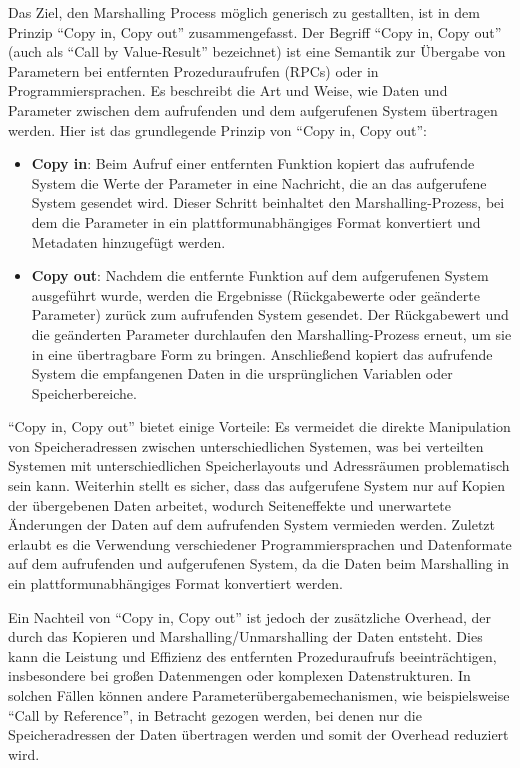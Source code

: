\documentclass[../vs-script-first-v01.tex]{subfiles}
\begin{document}
Das Ziel, den Marshalling Process möglich generisch zu gestallten, ist in dem Prinzip \enquote{Copy in, Copy out} zusammengefasst. Der Begriff \enquote{Copy in, Copy out} (auch als \enquote{Call by Value-Result} bezeichnet) ist eine Semantik zur Übergabe von Parametern bei entfernten Prozeduraufrufen (RPCs) oder in Programmiersprachen. Es beschreibt die Art und Weise, wie Daten und Parameter zwischen dem aufrufenden und dem aufgerufenen System übertragen werden. Hier ist das grundlegende Prinzip von \enquote{Copy in, Copy out}:
\begin{itemize} 
\item \textbf{Copy in}: Beim Aufruf einer entfernten Funktion kopiert das aufrufende System die Werte der Parameter in eine Nachricht, die an das aufgerufene System gesendet wird. Dieser Schritt beinhaltet den Marshalling-Prozess, bei dem die Parameter in ein plattformunabhängiges Format konvertiert und Metadaten hinzugefügt werden.
\item \textbf{Copy out}: Nachdem die entfernte Funktion auf dem aufgerufenen System ausgeführt wurde, werden die Ergebnisse (Rückgabewerte oder geänderte Parameter) zurück zum aufrufenden System gesendet. Der Rückgabewert und die geänderten Parameter durchlaufen den Marshalling-Prozess erneut, um sie in eine übertragbare Form zu bringen. Anschließend kopiert das aufrufende System die empfangenen Daten in die ursprünglichen Variablen oder Speicherbereiche.
\end{itemize} 
\enquote{Copy in, Copy out} bietet einige Vorteile: Es vermeidet die direkte Manipulation von Speicheradressen zwischen unterschiedlichen Systemen, was bei verteilten Systemen mit unterschiedlichen Speicherlayouts und Adressräumen problematisch sein kann. Weiterhin stellt es sicher, dass das aufgerufene System nur auf Kopien der übergebenen Daten arbeitet, wodurch Seiteneffekte und unerwartete Änderungen der Daten auf dem aufrufenden System vermieden werden. Zuletzt erlaubt es die Verwendung verschiedener Programmiersprachen und Datenformate auf dem aufrufenden und aufgerufenen System, da die Daten beim Marshalling in ein plattformunabhängiges Format konvertiert werden.

Ein Nachteil von \enquote{Copy in, Copy out} ist jedoch der zusätzliche Overhead, der durch das Kopieren und Marshalling/Unmarshalling der Daten entsteht. Dies kann die Leistung und Effizienz des entfernten Prozeduraufrufs beeinträchtigen, insbesondere bei großen Datenmengen oder komplexen Datenstrukturen. In solchen Fällen können andere Parameterübergabemechanismen, wie beispielsweise \enquote{Call by Reference}, in Betracht gezogen werden, bei denen nur die Speicheradressen der Daten übertragen werden und somit der Overhead reduziert wird. 
\end{document}
